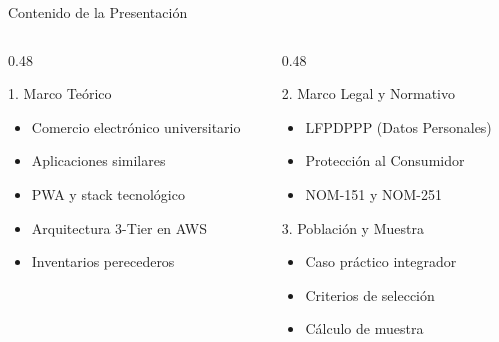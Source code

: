 \documentclass[aspectratio=169, 12pt]{beamer}
\newcommand{\tag}[1]{%
  \tikz[baseline=(t.base)]{\node[fill=bg2, draw=yellow1!30, text=yellow1,
  rounded corners=8pt, inner xsep=6pt, inner ysep=2pt,
  font=\tiny\bfseries] (t) {\MakeUppercase{#1}};}%
}
\begin{document}
\begin{frame}{\tag{Agenda} \; Contenido de la {\color{red1}Presentaci\'on}}
\vspace{4pt}
\begin{columns}[T]
\begin{column}{0.48\textwidth}
\begin{block}{1. Marco Te\'orico}
\begin{itemize}\small
  \item Comercio electr\'onico universitario
  \item Aplicaciones similares
  \item PWA y stack tecnol\'ogico
  \item Arquitectura 3-Tier en AWS
  \item Inventarios perecederos
\end{itemize}
\end{block}
\end{column}
\begin{column}{0.48\textwidth}
\begin{block}{2. Marco Legal y Normativo}
\begin{itemize}\small
  \item LFPDPPP (Datos Personales)
  \item Protecci\'on al Consumidor
  \item NOM-151 y NOM-251
\end{itemize}
\end{block}
\vspace{4pt}
\begin{alertblock}{3. Poblaci\'on y Muestra}
\begin{itemize}\small
  \item Caso pr\'actico integrador
  \item Criterios de selecci\'on
  \item C\'alculo de muestra
\end{itemize}
\end{alertblock}
\end{column}
\end{columns}
\end{frame}
\end{document}
